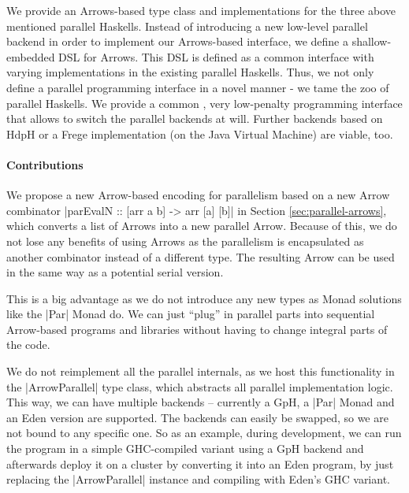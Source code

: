 We provide an Arrows-based type class and implementations for the three above mentioned parallel Haskells.
Instead of 
introducing a new low-level parallel backend in order to implement our
Arrows-based interface, we define a shallow-embedded DSL for Arrows. This DSL
is defined as a common interface with varying implementations in
the existing parallel Haskells. Thus, we not only define a parallel programming interface in a
novel manner - we tame the zoo of parallel Haskells. We provide a
common  , very low-penalty programming interface that allows to switch
the parallel backends at will. Further backends based on HdpH or a Frege implementation (on the Java Virtual Machine) are viable, too.

\paragraph{Contributions}
%
%
We propose a new Arrow-based encoding for parallelism based on a new Arrow combinator |parEvalN :: [arr a b] -> arr [a] [b]| in Section \ref{sec:parallel-arrows}, which converts a list of Arrows into a new parallel Arrow. Because of this, we do not lose any benefits of using Arrows as the parallelism is encapsulated as another combinator instead of a different type. The resulting Arrow can be used in the same way as a potential serial version.

This is a big advantage as we do not introduce any new types as Monad solutions like the |Par| Monad do. We can just \enquote{plug} in parallel parts into sequential Arrow-based programs and libraries without having to change integral parts of the code. 


We do not reimplement all the parallel internals, as we host this functionality in the |ArrowParallel| type class, which abstracts all parallel implementation logic. This way, we can have multiple backends -- currently a GpH, a |Par| Monad and an Eden version are supported. The backends can easily be swapped, so we are not bound to any specific one. So as an example, during development, we can run the program in a simple GHC-compiled variant using a GpH backend and afterwards deploy it on a cluster by converting it into an Eden program, by just replacing the |ArrowParallel| instance and compiling with Eden's GHC variant.


